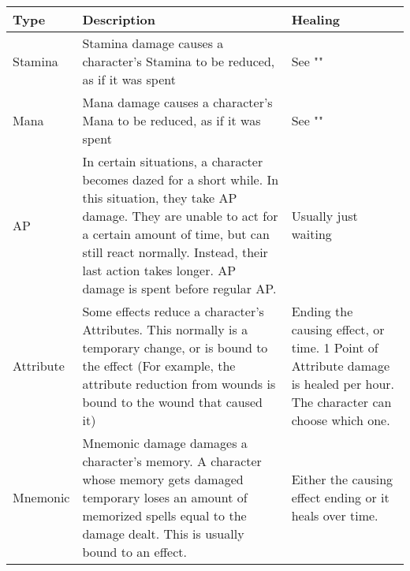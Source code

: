 \begin{longtable}{l p{5cm} p{5cm}}
Type & Description & Healing \\ \hline
Stamina & Stamina damage causes a character's Stamina to be reduced, as if it was spent & See "\nameref{subsec:recoverStamina}" \\
Mana & Mana damage causes a character's Mana to be reduced, as if it was spent & See "\nameref{subsec:recoverStamina}" \\
AP & In certain situations, a character becomes dazed for a short while. In this situation, they take AP damage. They are unable to act for a certain amount of time, but can still react normally. Instead, their last action takes longer. AP damage is spent before regular AP. & Usually just waiting\\
Attribute & Some effects reduce a character's Attributes. This normally is a temporary change, or is bound to the effect (For example, the attribute reduction from wounds is bound to the wound that caused it) & Ending the causing effect, or time. 1 Point of Attribute damage is healed per hour. The character can choose which one.\\
Mnemonic & Mnemonic damage damages a character's memory. A character whose memory gets damaged temporary loses an amount of memorized spells equal to the damage dealt. This is usually bound to an effect. & Either the causing effect ending or it heals over time.\\
\end{longtable}
